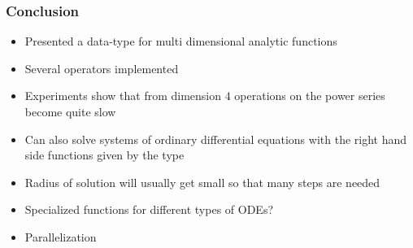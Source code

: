 \documentclass[xcolor=pdftex,dvipsnames,table]{beamer}
\begin{document}
\begin{frame}
  \frametitle{Conclusion}
  \begin{itemize}
  \item Presented a data-type for multi dimensional analytic functions
  \item Several operators implemented
  \item Experiments show that from dimension $4$ operations on the power series become quite slow
  \item Can also solve systems of ordinary differential equations with the right hand side functions given by the type
  \item Radius of solution will usually get small so that many steps are needed
  \item Specialized functions for different types of ODEs?
  \item Parallelization
  \end{itemize}
  \end{frame}
%
\end{document}
